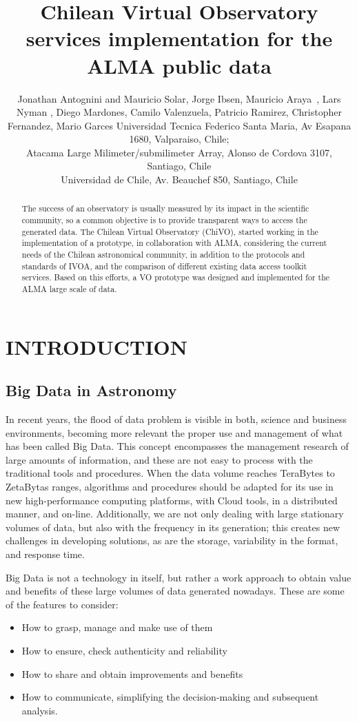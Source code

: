 \documentclass[]{spie}
\title{Chilean Virtual Observatory services implementation for the ALMA public data}
\author{Jonathan Antognini\supit{a} and Mauricio Solar\supit{a}, Jorge Ibsen\supit{b}, Mauricio Araya \supit{a}, 
Lars Nyman \supit{b}, Diego Mardones\supit{c}, Camilo Valenzuela\supit{a}, Patricio Ramirez\supit{a}, 
Christopher Fernandez\supit{a}, Mario Garces\supit{a}
\skiplinehalf
\supit{a}Universidad Tecnica Federico Santa Maria, Av Esapana 1680, Valparaiso, Chile; \\
\supit{b}Atacama Large Milimeter/submilimeter Array, Alonso de Cordova 3107, Santiago, Chile \\
\supit{c}Universidad de Chile, Av. Beauchef 850, Santiago, Chile \\
}
\begin{document}
 
\maketitle 

\begin{abstract}
The success of an observatory is usually measured by its impact in the
scientific community, so a common objective is to provide transparent ways to
access the generated data. The Chilean Virtual Observatory (ChiVO), started
working in the implementation of a prototype, in collaboration with ALMA,
considering the current needs of the Chilean astronomical community, in
addition to the protocols and standards of IVOA, and the comparison of
different existing data access toolkit services. Based on this efforts, a VO
prototype was designed and implemented for the ALMA large scale of data.
\end{abstract}


\section{INTRODUCTION}
\label{sec:intro}  %

\subsection{Big Data in Astronomy}
\label{sec:bdastronomy}
In recent years, the flood of data problem is visible in both, science and
business environments, becoming more relevant the proper use and management of
what has been called Big Data. This concept encompasses the management research
of large amounts of information, and these are not easy to process with the
traditional tools and procedures.  When the data volume reaches TeraBytes to
ZetaBytas ranges, algorithms and procedures should be adapted for its use in
new high-performance computing platforms, with Cloud tools, in a distributed
manner, and on-line.  Additionally, we are not only dealing with large
stationary volumes of data, but also with the frequency in its generation; this
creates new challenges in developing solutions, as are the storage, variability
in the format, and response time.  

Big Data is not a technology in itself, but rather a work approach to obtain
value and benefits of these large volumes of data generated nowadays.   These
are some of the features to consider:
\begin{itemize}
\item How to grasp, manage and make use of them
\item How to ensure, check authenticity and reliability
\item How to share and obtain improvements and benefits
\item How to communicate, simplifying the decision-making and subsequent analysis.
\end{itemize}
\end{document}
